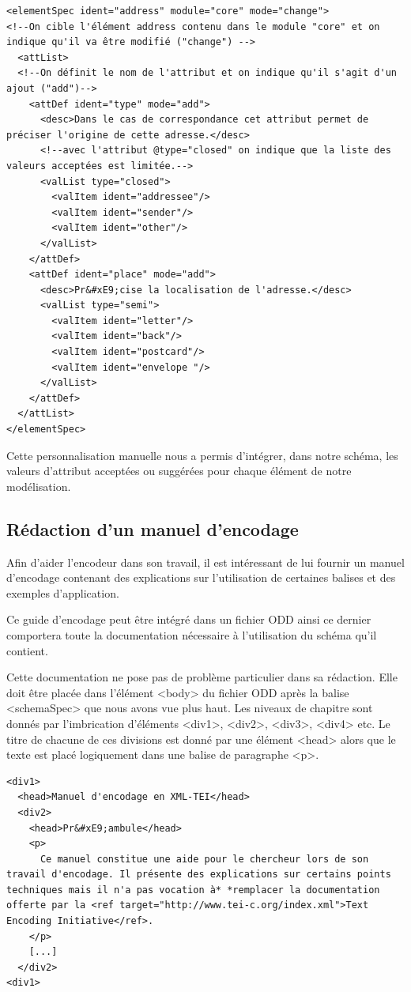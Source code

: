\documentclass[12pt,a4paper]{book} %
\begin{document}
\begin{lstlisting}
<elementSpec ident="address" module="core" mode="change">
<!--On cible l'élément address contenu dans le module "core" et on indique qu'il va être modifié ("change") -->
  <attList>
  <!--On définit le nom de l'attribut et on indique qu'il s'agit d'un ajout ("add")-->
    <attDef ident="type" mode="add">
      <desc>Dans le cas de correspondance cet attribut permet de préciser l'origine de cette adresse.</desc>
      <!--avec l'attribut @type="closed" on indique que la liste des valeurs acceptées est limitée.-->
      <valList type="closed">
        <valItem ident="addressee"/>
        <valItem ident="sender"/>
        <valItem ident="other"/>        
      </valList>
    </attDef>
    <attDef ident="place" mode="add">
      <desc>Pr&#xE9;cise la localisation de l'adresse.</desc>
      <valList type="semi">
        <valItem ident="letter"/>
        <valItem ident="back"/>
        <valItem ident="postcard"/>
        <valItem ident="envelope "/>
      </valList>
    </attDef>
  </attList>
</elementSpec>
\end{lstlisting}
\bigskip

Cette personnalisation manuelle nous a permis d'intégrer, dans notre schéma, les valeurs d'attribut acceptées ou suggérées pour chaque élément de notre modélisation.

\subsection{Rédaction d'un manuel d'encodage}

Afin d'aider l'encodeur dans son travail, il est intéressant de lui fournir un manuel d'encodage contenant des explications sur l'utilisation de certaines balises et des exemples d'application.

Ce guide d'encodage peut être intégré dans un fichier ODD ainsi ce dernier comportera toute la documentation nécessaire à l'utilisation du schéma qu'il contient.

Cette documentation ne pose pas de problème particulier dans sa rédaction. Elle doit être placée dans l'élément <body> du fichier ODD après la balise <schemaSpec> que nous avons vue plus haut. Les niveaux de chapitre sont donnés par l'imbrication d'éléments <div1>, <div2>, <div3>, <div4> etc.
Le titre de chacune de ces divisions est donné par une élément <head> alors que le texte est placé logiquement dans une balise de paragraphe <p>.
\bigskip 

\begin{lstlisting}
<div1>
  <head>Manuel d'encodage en XML-TEI</head>
  <div2>
    <head>Pr&#xE9;ambule</head>
    <p> 
      Ce manuel constitue une aide pour le chercheur lors de son travail d'encodage. Il présente des explications sur certains points techniques mais il n'a pas vocation à* *remplacer la documentation offerte par la <ref target="http://www.tei-c.org/index.xml">Text Encoding Initiative</ref>. 
    </p>
    [...]
  </div2>
<div1>            
\end{lstlisting}
\bigskip 
\end{document}
